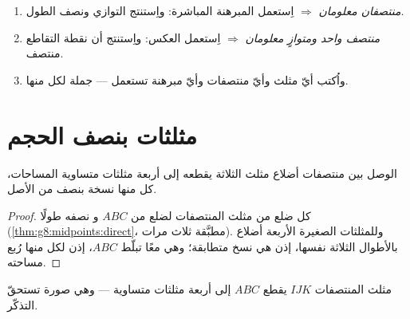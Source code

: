 \begin{method}\label{met:g8:midpoints:choose}
\begin{enumerate}
  \item \emph{منتصفان معلومان} $\Rightarrow$ اِستعمل المبرهنة
        المباشرة: واِستنتج التوازي ونصف الطول.
  \item \emph{منتصف واحد ومتوازٍ معلومان} $\Rightarrow$ اِستعمل
        العكس: واِستنتج أن نقطة التقاطع منتصف.
  \item واُكتب أيّ مثلث وأيّ منتصفات وأيّ مبرهنة
        تستعمل --- جملة لكل منها.
\end{enumerate}
\end{method}

\section{مثلثات بنصف الحجم}

\begin{proposition}\label{prop:g8:midpoints:medial}
الوصل بين منتصفات أضلاع مثلث الثلاثة يقطعه إلى
أربعة مثلثات متساوية المساحات، كل منها نسخة بنصف  من الأصل.
\end{proposition}

\begin{proof}
كل ضلع من مثلث المنتصفات  لضلع من $ABC$ و
نصفه طولًا (\cref{thm:g8:midpoints:direct}، مطبَّقة ثلاث مرات).
وللمثلثات الصغيرة الأربعة أضلاع بالأطوال الثلاثة نفسها، إذن
هي نسخ متطابقة؛ وهي معًا تبلّط $ABC$، إذن لكل منها
رُبع مساحته.
\end{proof}

\begin{omfigure}

{\small مثلث المنتصفات $IJK$ يقطع $ABC$ إلى أربعة مثلثات
متساوية --- وهي صورة تستحقّ التذكّر.}
\end{omfigure}

